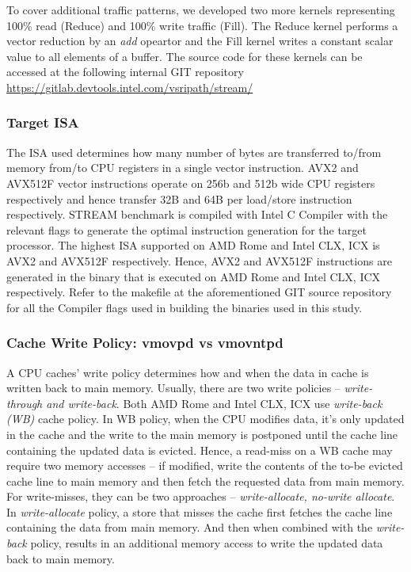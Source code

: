 \documentclass{article}
\begin{document}
To cover additional traffic patterns, we developed two more kernels representing 100\% read (Reduce) and 100\% write traffic (Fill). The Reduce kernel performs a vector reduction by an \textit{add} opeartor and the Fill kernel writes a constant scalar value to all elements of a buffer. The source code for these kernels can be accessed at the following internal GIT repository \url{https://gitlab.devtools.intel.com/vsripath/stream/}

\subsubsection{Target ISA}
The ISA used determines how many number of bytes are transferred to/from memory from/to CPU registers in a single vector instruction. AVX2 and AVX512F vector instructions operate on 256b and 512b wide CPU registers respectively and hence transfer 32B and 64B per load/store instruction respectively. STREAM benchmark is compiled with Intel C Compiler with the relevant flags to generate the optimal instruction generation for the target processor. The highest ISA supported on AMD Rome and Intel CLX, ICX is AVX2 and AVX512F respectively. Hence, AVX2 and AVX512F instructions are generated in the binary that is executed on AMD Rome and Intel CLX, ICX respectively. Refer to the makefile at the aforementioned GIT source repository for all the Compiler flags used in building the binaries used in this study.

\subsubsection{Cache Write Policy: vmovpd vs vmovntpd}
A CPU caches' write policy determines how and when the data in cache is written back to main memory. Usually, there are two write policies -- \textit{write-through and write-back}. Both AMD Rome and Intel CLX, ICX use \textit{write-back (WB)} cache policy. In WB policy, when the CPU modifies data, it's only updated in the cache and the write to the main memory is postponed until the cache line containing the updated data is evicted. Hence, a read-miss on a WB cache may require two memory accesses -- if modified, write the contents of the to-be evicted cache line to main memory and then fetch the requested data from main memory. For write-misses, they can be two approaches -- \textit{write-allocate, no-write allocate}. In \textit{write-allocate} policy, a store that misses the cache first fetches the cache line containing the data from main memory. And then when combined with the \textit{write-back} policy, results in an additional memory access to write the updated data back to main memory.
\end{document}
